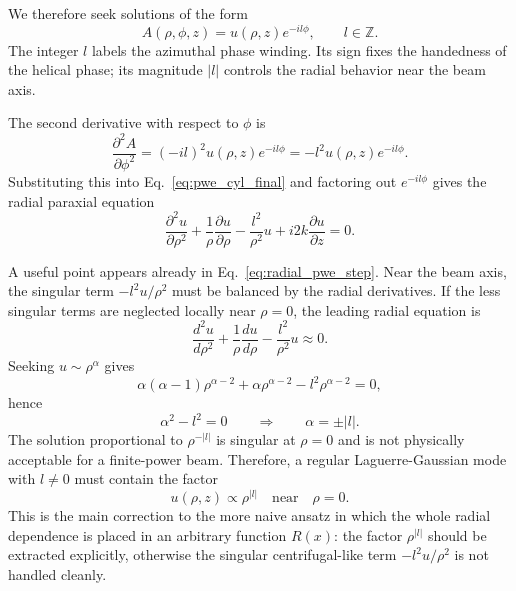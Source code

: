 \begin{resolucao}[Solution]
    We therefore seek solutions of the form
    \begin{equation}
        A(\rho,\phi,z)
        =
        u(\rho,z)e^{-il\phi},
        \qquad
        l\in\mathbb{Z}.
        \label{eq:azimuthal_sep}
    \end{equation}
    The integer $l$ labels the azimuthal phase winding. Its sign fixes the handedness of the helical phase; its magnitude $|l|$ controls the radial behavior near the beam axis.

    The second derivative with respect to $\phi$ is
    \begin{equation}
        \frac{\partial^2 A}{\partial \phi^2}
        =
        (-il)^2u(\rho,z)e^{-il\phi}
        =
        -l^2u(\rho,z)e^{-il\phi}.
    \end{equation}
    Substituting this into Eq.~\eqref{eq:pwe_cyl_final} and factoring out $e^{-il\phi}$ gives the radial paraxial equation
    \begin{equation}
        \frac{\partial^2 u}{\partial \rho^2}
        +
        \frac{1}{\rho}
        \frac{\partial u}{\partial \rho}
        -
        \frac{l^2}{\rho^2}u
        +
        i2k
        \frac{\partial u}{\partial z}
        =
        0.
        \label{eq:radial_pwe_step}
    \end{equation}

    A useful point appears already in Eq.~\eqref{eq:radial_pwe_step}. Near the beam axis, the singular term $-l^2u/\rho^2$ must be balanced by the radial derivatives. If the less singular terms are neglected locally near $\rho=0$, the leading radial equation is
    \begin{equation}
        \frac{d^2u}{d\rho^2}
        +
        \frac{1}{\rho}
        \frac{du}{d\rho}
        -
        \frac{l^2}{\rho^2}u
        \approx
        0.
    \end{equation}
    Seeking $u\sim \rho^\alpha$ gives
    \begin{equation}
        \alpha(\alpha-1)\rho^{\alpha-2}
        +
        \alpha\rho^{\alpha-2}
        -
        l^2\rho^{\alpha-2}
        =
        0,
    \end{equation}
    hence
    \begin{equation}
        \alpha^2-l^2=0
        \qquad\Rightarrow\qquad
        \alpha=\pm |l|.
    \end{equation}
    The solution proportional to $\rho^{-|l|}$ is singular at $\rho=0$ and is not physically acceptable for a finite-power beam. Therefore, a regular Laguerre-Gaussian mode with $l\neq 0$ must contain the factor
    \begin{equation}
        u(\rho,z)\propto \rho^{|l|}
        \quad
        \text{near}
        \quad
        \rho=0.
        \label{eq:near_axis_behavior}
    \end{equation}
    This is the main correction to the more naive ansatz in which the whole radial dependence is placed in an arbitrary function $R(x)$: the factor $\rho^{|l|}$ should be extracted explicitly, otherwise the singular centrifugal-like term $-l^2u/\rho^2$ is not handled cleanly.


\end{resolucao}
